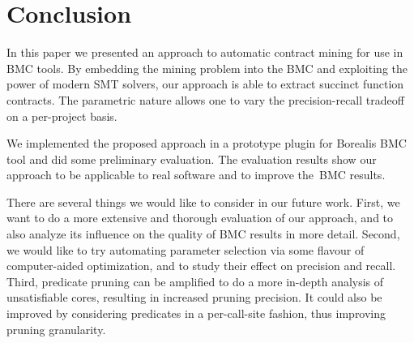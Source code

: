 \section{Conclusion}

In this paper we presented an approach to automatic contract mining for use in BMC tools. By embedding the mining problem into the BMC and exploiting the power of modern SMT solvers, our approach is able to extract succinct function contracts. The parametric nature allows one to vary the precision-recall tradeoff on a per-project basis.

We implemented the proposed approach in a prototype plugin for Borealis BMC tool and did some preliminary evaluation. The evaluation results show our approach to be applicable to real software and to improve the~BMC results.

There are several things we would like to consider in our future work. First, we want to do a more extensive and thorough evaluation of our approach, and to also analyze its influence on the quality of BMC results in more detail. Second, we would like to try automating parameter selection via some flavour of computer-aided optimization, and to study their effect on precision and recall. Third, predicate pruning can be amplified to do a more in-depth analysis of unsatisfiable cores, resulting in increased pruning precision. It could also be improved by considering predicates in a per-call-site fashion, thus improving pruning granularity.
